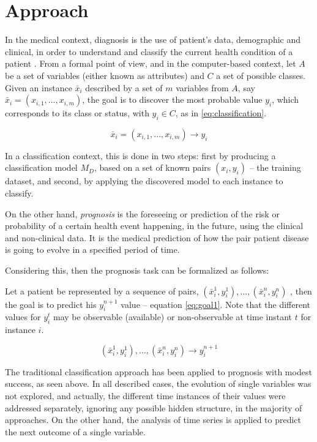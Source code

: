 \chapter{Approach}
\label{chapter:approach}


In the medical context, diagnosis is the use of patient’s data, demographic and clinical, in order to understand 
and classify the current health condition of a patient \cite{Steyerberg2005}. From a formal point of view, and in the computer-based 
context, let $A$ be a set of variables (either known as attributes) and $C$ a set of possible classes. Given an instance
 $\bar{x}_i$ described by a set of $m$ variables from $A$, say $\bar{x}_i = (x_{i,1},... ,x_{i,m})$, the goal is to discover the most
 probable value $y_i$, which corresponds to its class or status, with $y_i \in C$, as in \ref{eq:classification}.

\begin{equation}
	\bar{x}_i = (x_{i,1},... ,x_{i,m}) \rightarrow y_i
\label{eq:classification}
\end{equation}

In a classification context, this is done in two steps: first by producing a classification model $M_D$, based on a set of known
 pairs $(x_i, y_i)$ – the training dataset, and second, by applying the discovered model to each instance to classify.

On the other hand, \emph{prognosis} is the foreseeing or prediction of the risk or probability of a certain health event happening,
 in the future, using the clinical and non-clinical data. It is the medical prediction of how the pair patient disease is going
 to evolve in a specified period of time.

Considering this, then the prognosis task can be formalized as follows:

Let a patient be represented by a sequence of pairs, $(\bar{x}_i^1,y_i^1 ),...,(\bar{x}_i^n,y_i^n )$ , then the goal is to predict
 his $y_i^{n+1}$ value – equation \ref{eq:goal1}. Note that the different values for $y_i^t$ may be observable (available) or non-observable 
 at time instant $t$ for instance $i$.

\begin{equation}
	(\bar{x}_i^1,y_i^1 ),...,(\bar{x}_i^n,y_i^n ) \rightarrow y_i^{n+1}
\label{eq:goal1}
\end{equation}

The traditional classification approach has been applied to prognosis with modest success, as seen above. In all described 
 cases, the evolution of single variables was not explored, and actually, the different time instances of their values were
 addressed separately, ignoring any possible hidden structure, in the majority of approaches. On the other hand, the analysis 
 of time series is applied to predict the next outcome of a single variable.
 
